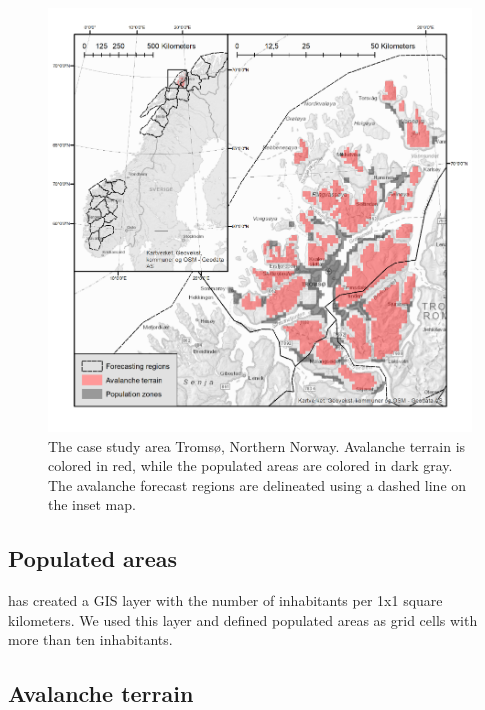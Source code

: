 \documentclass[authordate,empirical, issue]{jote-new-article}
\begin{document}
\begin{figure}
  \begin{fullwidth}
    \includegraphics[width=\linewidth]{media/image3.png}
    \caption{The case study area Tromsø, Northern Norway. Avalanche terrain is colored in red, while the populated areas are colored in dark gray. The avalanche forecast regions are delineated using a dashed line on the inset map.}
    \label{fig:rId10}

  \end{fullwidth}
\end{figure}






\subsection{Populated areas}



\textcite{StatisticsNorway2021} has created a GIS layer with the number of inhabitants per 1x1 square kilometers. We used this layer and defined populated areas as grid cells with more than ten inhabitants.







\subsection{Avalanche terrain}
\end{document}
